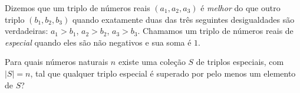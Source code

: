Dizemos que um triplo de números reais \( (a_1,a_2,a_3)\) é \textit{melhor} do que outro triplo \( (b_1,b_2,b_3)\) quando exatamente duas das três seguintes desigualdades são verdadeiras: \( a_1 > b_1\), \( a_2 > b_2\), \( a_3 > b_3\). Chamamos um triplo de números reais de \textit{especial} quando eles são não negativos e sua soma é \( 1\).

Para quais números naturais \( n\) existe uma coleção \( S\) de triplos especiais, com \( |S| = n\), tal que qualquer triplo especial é superado por pelo menos um elemento de \( S\)?
